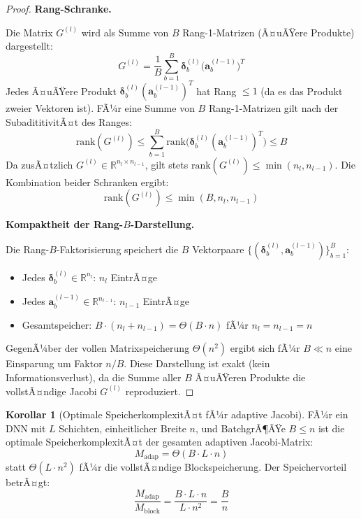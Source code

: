 ﻿\documentclass[a4paper,12pt]{article}
\theoremstyle{definition}
\newtheorem{korollar}{Korollar}
\begin{document}
\begin{proof}
	\textbf{Rang-Schranke.}
	
	Die Matrix $G^{(l)}$ wird als Summe von $B$ Rang-1-Matrizen (Ã¤uÃŸere Produkte) dargestellt:
	\[
	G^{(l)} = \frac{1}{B} \sum_{b=1}^B \boldsymbol{\delta}^{(l)}_b \bigl(\boldsymbol{a}^{(l-1)}_b\bigr)^T
	\]
	Jedes Ã¤uÃŸere Produkt $\boldsymbol{\delta}^{(l)}_b (\boldsymbol{a}^{(l-1)}_b)^T$ hat Rang $\leq 1$ (da es das Produkt zweier Vektoren ist). FÃ¼r eine Summe von $B$ Rang-1-Matrizen gilt nach der SubadititivitÃ¤t des Ranges:
	\[
	\mathrm{rank}(G^{(l)}) \leq \sum_{b=1}^B \mathrm{rank}\bigl(\boldsymbol{\delta}^{(l)}_b (\boldsymbol{a}^{(l-1)}_b)^T\bigr) \leq B
	\]
	Da zusÃ¤tzlich $G^{(l)} \in \mathbb{R}^{n_l \times n_{l-1}}$, gilt stets $\mathrm{rank}(G^{(l)}) \leq \min(n_l, n_{l-1})$. Die Kombination beider Schranken ergibt:
	\[
	\mathrm{rank}(G^{(l)}) \leq \min(B, n_l, n_{l-1})
	\]
	
	\textbf{Kompaktheit der Rang-$B$-Darstellung.}
	
	Die Rang-$B$-Faktorisierung speichert die $B$ Vektorpaare $\{(\boldsymbol{\delta}^{(l)}_b, \boldsymbol{a}^{(l-1)}_b)\}_{b=1}^B$:
	\begin{itemize}
		\item Jedes $\boldsymbol{\delta}^{(l)}_b \in \mathbb{R}^{n_l}$: $n_l$ EintrÃ¤ge
		\item Jedes $\boldsymbol{a}^{(l-1)}_b \in \mathbb{R}^{n_{l-1}}$: $n_{l-1}$ EintrÃ¤ge
		\item Gesamtspeicher: $B \cdot (n_l + n_{l-1}) = \Theta(B \cdot n)$ fÃ¼r $n_l = n_{l-1} = n$
	\end{itemize}
	GegenÃ¼ber der vollen Matrixspeicherung $\Theta(n^2)$ ergibt sich fÃ¼r $B \ll n$ eine Einsparung um Faktor $n/B$. Diese Darstellung ist exakt (kein Informationsverlust), da die Summe aller $B$ Ã¤uÃŸeren Produkte die vollstÃ¤ndige Jacobi $G^{(l)}$ reproduziert.
\end{proof}

\begin{korollar}[Optimale SpeicherkomplexitÃ¤t fÃ¼r adaptive Jacobi]
	\label{cor:memory}
	FÃ¼r ein DNN mit $L$ Schichten, einheitlicher Breite $n$, und BatchgrÃ¶ÃŸe $B \leq n$ ist die optimale SpeicherkomplexitÃ¤t der gesamten adaptiven Jacobi-Matrix:
	\[
	M_{\mathrm{adap}} = \Theta(B \cdot L \cdot n)
	\]
	statt $\Theta(L \cdot n^2)$ fÃ¼r die vollstÃ¤ndige Blockspeicherung. Der Speichervorteil betrÃ¤gt:
	\[
	\frac{M_{\mathrm{adap}}}{M_{\mathrm{block}}} = \frac{B \cdot L \cdot n}{L \cdot n^2} = \frac{B}{n}
	\]
\end{korollar}
\end{document}
